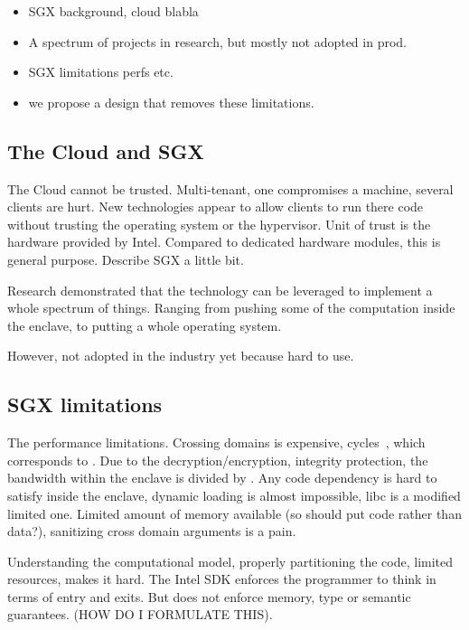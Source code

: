 \begin{itemize}

\item SGX background, cloud blabla

\item A spectrum of projects in research, but mostly not adopted in prod.

\item SGX limitations perfs etc.

\item we propose a design that removes these limitations.

\end{itemize}

\subsection{The Cloud and SGX}

The Cloud cannot be trusted.
Multi-tenant, one compromises a machine, several clients are hurt.
New technologies appear to allow clients to run there code without trusting the operating system or the hypervisor.
Unit of trust is the hardware provided by Intel.
Compared to dedicated hardware modules, this is general purpose.
Describe SGX a little bit.

Research demonstrated that the technology can be leveraged to implement a whole spectrum of things.
Ranging from pushing some of the computation inside the enclave, to putting a whole operating system.

However, not adopted in the industry yet because hard to use.

\subsection{SGX limitations}

The performance limitations.
Crossing domains is expensive, \sgxcycles cycles~\cite{DBLP:conf/IEEEwisa/ZhaoSTZX16}, which corresponds to \sgxlatency.
Due to the decryption/encryption, integrity protection, the bandwidth within the enclave is divided by \sgxbwpenalty.
Any code dependency is hard to satisfy inside the enclave, dynamic loading is almost impossible, libc is a modified limited one.
Limited amount of memory available (so should put code rather than data?), sanitizing cross domain arguments is a pain.

Understanding the computational model, properly partitioning the code, limited resources, makes it hard.
The Intel SDK enforces the programmer to think in terms of entry and exits.
But does not enforce memory, type or semantic guarantees. (HOW DO I FORMULATE THIS).

